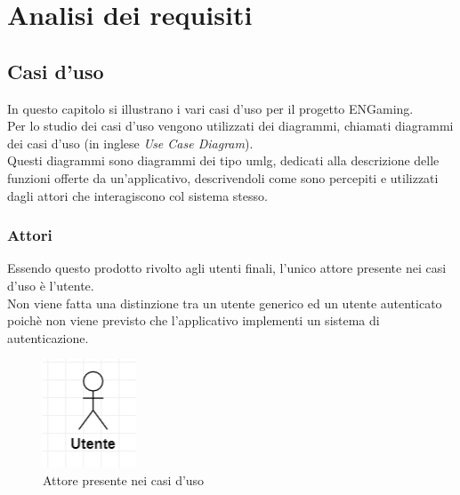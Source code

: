 
\chapter{Analisi dei requisiti}
\label{cap:analisi-requisiti}

\section{Casi d'uso}

In questo capitolo si illustrano i vari casi d'uso per il progetto ENGaming.\\
Per lo studio dei casi d'uso vengono utilizzati dei diagrammi, chiamati diagrammi dei casi d'uso (in inglese \emph{Use Case Diagram}).\\
Questi diagrammi sono diagrammi dei tipo \gls{umlg}, dedicati alla descrizione delle funzioni offerte da un'applicativo, descrivendoli come sono percepiti e utilizzati dagli attori che interagiscono col sistema stesso.

\subsection{Attori}

Essendo questo prodotto rivolto agli utenti finali, l'unico attore presente nei casi d'uso è l'utente.\\
Non viene fatta una distinzione tra un utente generico ed un utente autenticato poichè non viene previsto che l'applicativo implementi un sistema di autenticazione.

\begin{figure}[h]
    \centering
    \includegraphics{images/usecase/attore.png}
    \caption{Attore presente nei casi d'uso}
    \label{fig:attore}
\end{figure}

